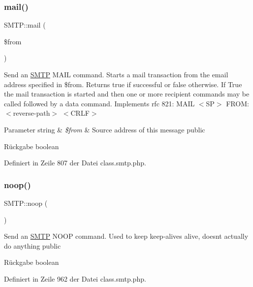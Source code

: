 \subsubsection{\texorpdfstring{mail()}{mail()}}
{\footnotesize\ttfamily S\+M\+T\+P\+::mail (\begin{DoxyParamCaption}\item[{}]{\$from }\end{DoxyParamCaption})}

Send an \mbox{\hyperlink{class_s_m_t_p}{S\+M\+TP}} M\+A\+IL command. Starts a mail transaction from the email address specified in \$from. Returns true if successful or false otherwise. If True the mail transaction is started and then one or more recipient commands may be called followed by a data command. Implements rfc 821\+: M\+A\+IL $<$\+S\+P$>$ F\+R\+OM\+:$<$reverse-\/path$>$ $<$\+C\+R\+L\+F$>$ 
\begin{DoxyParams}[1]{Parameter}
string & {\em \$from} & Source address of this message  public \\
\hline
\end{DoxyParams}
\begin{DoxyReturn}{Rückgabe}
boolean 
\end{DoxyReturn}


Definiert in Zeile 807 der Datei class.\+smtp.\+php.

\mbox{\label{class_s_m_t_p_a8e5454df733f222c1deb352f05ddf82d}} 
\subsubsection{\texorpdfstring{noop()}{noop()}}
{\footnotesize\ttfamily S\+M\+T\+P\+::noop (\begin{DoxyParamCaption}{ }\end{DoxyParamCaption})}

Send an \mbox{\hyperlink{class_s_m_t_p}{S\+M\+TP}} N\+O\+OP command. Used to keep keep-\/alives alive, doesn\textquotesingle{}t actually do anything  public \begin{DoxyReturn}{Rückgabe}
boolean 
\end{DoxyReturn}


Definiert in Zeile 962 der Datei class.\+smtp.\+php.

\mbox{\label{class_s_m_t_p_ab2b2c38a7d482ba6693aefd9c436fc94}} 
